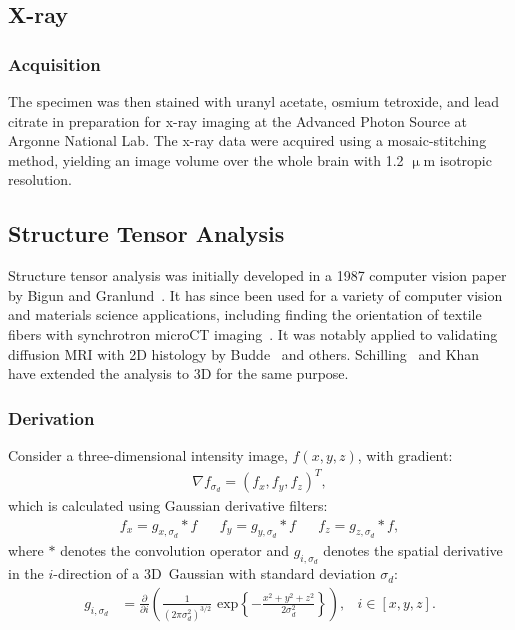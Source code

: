 \documentclass[11pt]{article}
\begin{document}
\subsection{X-ray}
\subsubsection{Acquisition}
The specimen was then stained with uranyl acetate,
osmium tetroxide, and lead citrate in preparation for x-ray imaging at the
Advanced Photon Source at Argonne National Lab. The x-ray data were acquired
using a mosaic-stitching method, yielding an image volume over the whole brain
with 1.2 $\upmu$m isotropic resolution.


\subsection{Structure Tensor Analysis}
Structure tensor analysis was initially developed in a 1987 computer vision
paper by Bigun and Granlund~\cite{Bigun1987}. It has since been used for a
variety of computer vision and materials science applications, including finding
the orientation of textile fibers with synchrotron microCT
imaging~\cite{Straumit2015}. It was notably applied to validating diffusion MRI
with 2D histology by Budde~\cite{Budde2012,Budde2013} and
others. Schilling~\cite{Schilling2016,Schilling2018} and Khan~\cite{Khan2015}
have extended the analysis to 3D for the same purpose.

\subsubsection{Derivation}

Consider a three-dimensional intensity image, $f(x,y,z)$, with gradient:
\begin{align}
  \label{eq:grad}
  \nabla f_{\sigma_d} = {\left(f_x, f_y, f_z\right)}^T,
\end{align}
which is calculated using Gaussian derivative filters:
\begin{align}
  \label{eq:gradcomps}
  f_x = g_{x,\sigma_d} \ast f & &  f_y = g_{y,\sigma_d} \ast f & &  f_z = g_{z,\sigma_d} \ast f,
\end{align}
where $\ast$ denotes the convolution operator and $g_{i, \sigma_d}$ denotes the
spatial derivative in the $i$-direction of a 3D~Gaussian with
standard deviation $\sigma_d$:
\begin{align}
  \label{eq:gauss}
  g_{i,\sigma_d} &= \frac{\partial}{\partial i}\left(\frac{1}{\left(2\pi\sigma_d^2\right)^{3/2}}\text{ exp}\left\{-\frac{x^2 + y^2 + z^2}{2\sigma_d^2}\right\}\right), & i \in [x, y, z].
\end{align}
\end{document}
